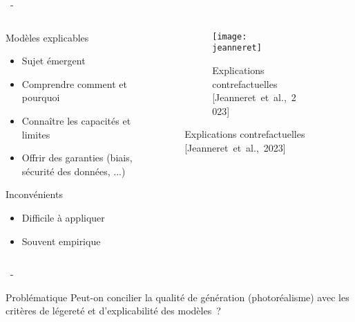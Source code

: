 \documentclass[aspectratio=169, 22pt]{beamer}
\begin{document}
\begin{frame}{\secname~- \subsecname}
  \begin{columns}
    \begin{column}{0.5\linewidth}
      \begin{block}{Modèles explicables}        
        \begin{itemize}
        \item \small Sujet émergent
        \item \small Comprendre comment et pourquoi 
        \item \small Connaître les capacités et limites
        \item \small Offrir des garanties (biais, sécurité des données, ...)
        \end{itemize}
      \end{block}
      \begin{alertblock}{Inconvénients}
        \begin{itemize}
        \item \small Difficile à appliquer
        \item \small Souvent empirique
        \end{itemize}
      \end{alertblock}
    \end{column}
    \begin{column}{0.5\linewidth}
      \begin{figure}
        \begin{subfigure}{0.6\linewidth}
          \centering
          \texttt{[image: jeanneret]}
          \caption{Explications contrefactuelles [Jeanneret et al., 2023]}
        \end{subfigure}
      \end{figure}
    \end{column}
  \end{columns}    
\end{frame}

\begin{frame}{\secname~- \subsecname}
  \begin{customblock}{\centering Problématique}
    \centering
    Peut-on concilier la qualité de génération (photoréalisme) avec
    les critères de légereté et d'explicabilité des modèles ?
  \end{customblock}
\end{frame}
\end{document}
